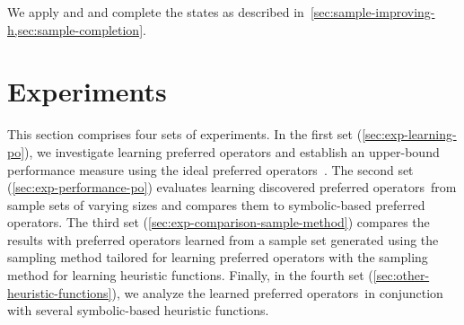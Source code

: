 \documentclass[ppgc,diss,english]{iiufrgs}
\begin{document}
We apply \sai and \sui and complete the states as described in~\cref{sec:sample-improving-h,sec:sample-completion}.


%
%
\chapter{Experiments}
\label{cha:exp-experiments}
This section comprises four sets of experiments. In the first set (\cref{sec:exp-learning-po}), we investigate learning preferred operators and establish an upper-bound performance measure using the ideal preferred operators~\postar. The second set (\cref{sec:exp-performance-po}) evaluates learning discovered preferred operators~\pog from sample sets of varying sizes and compares them to symbolic-based preferred operators. The third set (\cref{sec:exp-comparison-sample-method}) compares the results with preferred operators learned from a sample set generated using the sampling method tailored for learning preferred operators with the sampling method for learning heuristic functions. Finally, in the fourth set (\cref{sec:other-heuristic-functions}), we analyze the learned preferred operators~\pog in conjunction with several symbolic-based heuristic functions.
\end{document}
